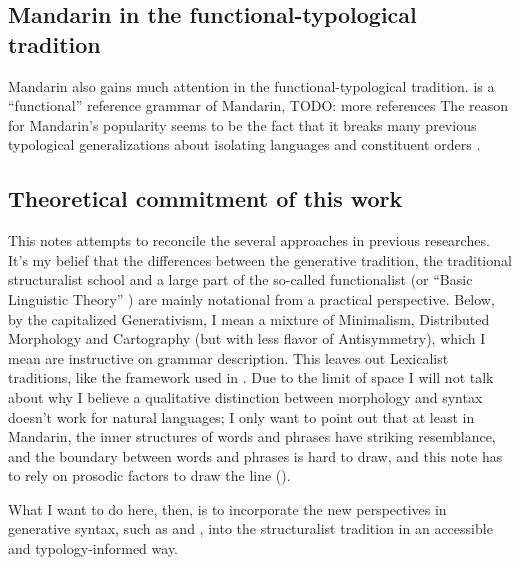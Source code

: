 \documentclass[UTF8, a4paper, oneside, scheme=plain]{ctexrep}
\newcommand*{\citechap}[1]{chap.~{#1}}
\begin{document}
\subsection{Mandarin in the functional-typological tradition}

Mandarin also gains much attention in the functional-typological tradition.
\citet{li1989mandarin} is a ``functional'' reference grammar of Mandarin, TODO: more references
The reason for Mandarin's popularity seems to be the fact that 
it breaks many previous typological generalizations about isolating languages and constituent orders
\citep[\citechap{8}]{paul2014new}.

\subsection{Theoretical commitment of this work}\label{sec:theory}

This notes attempts to reconcile the several approaches in previous researches.
It's my belief that the differences between the generative tradition, 
the traditional structuralist school 
and a large part of the so-called functionalist 
(or ``Basic Linguistic Theory'' \citep{dixon2009basic}) 
are mainly notational from a practical perspective.
Below, by the capitalized Generativism,
I mean a mixture of Minimalism, Distributed Morphology and Cartography
(but with less flavor of Antisymmetry),
which I mean are instructive on grammar description.
This leaves out Lexicalist traditions, 
like the framework used in \citet{deng2010formal}.
Due to the limit of space I will not talk about 
why I believe a qualitative distinction between morphology and syntax 
doesn't work for natural languages; 
I only want to point out that at least in Mandarin, 
the inner structures of words and phrases 
have striking resemblance, 
and the boundary between words and phrases 
is hard to draw, 
and this note has to rely on prosodic factors to draw the line
().

What I want to do here, then, 
is to incorporate the new perspectives in generative syntax, 
such as \citet{paul2014new} and \citet{paul2008serial},
into the structuralist tradition
in an accessible and typology-informed way.
\end{document}
